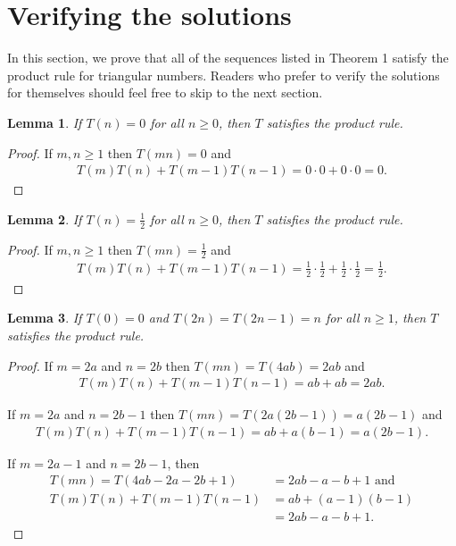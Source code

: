 \documentclass[11pt,fleqn]{amsart}
\newtheorem{lemma}{Lemma}
\begin{document}
\section{Verifying the solutions}
In this section, we prove that all of the sequences listed in Theorem 1 
satisfy the product rule for triangular numbers. Readers who prefer to
verify the solutions for themselves should feel free to skip to the next
section.

\begin{lemma}
If $T(n) = 0$ for all $n \ge 0$, then $T$ satisfies the product rule.
\end{lemma}

\begin{proof}
If $m, n \ge 1$ then $T(mn) = 0$ and
\begin{align*}
T(m) T(n) + T(m-1) T(n-1) =  0\cdot 0 + 0\cdot 0 = 0.
\end{align*}
\end{proof}

\begin{lemma}
If $T(n) = \frac12$ for all $n\ge0$, then $T$ satisfies the product rule.
\end{lemma}
\begin{proof}
If $m, n \ge 1$ then $T(mn) = \frac12$ and
\begin{align*}
T(m) T(n) + T(m-1) T(n-1) = \tfrac12 \cdot \tfrac12 + \tfrac12 \cdot \tfrac12 = \tfrac12.
\end{align*}
\end{proof}

\begin{lemma}
If $T(0) = 0$ and $T(2n) = T(2n-1) = n$ for all $n \ge 1$, then $T$ satisfies the product rule.
\end{lemma}

\begin{proof}
If $m=2a$ and $n=2b$ then $T(mn) = T(4ab) = 2ab$ and
\begin{align*}
T(m) T(n) + T(m-1) T(n-1) = ab + ab = 2ab.
\end{align*}

If $m=2a$ and $n=2b-1$ then $T(mn) = T(2a(2b-1)) = a(2b-1)$ and
\begin{align*}
T(m) T(n) + T(m-1) T(n-1) = ab + a(b-1) = a(2b-1).
\end{align*}

If $m=2a-1$ and $n=2b-1$, then 
\begin{align*}
 T(mn)  = T(4ab-2a-2b+1) & = 2ab - a - b + 1 \text{ and} \\
 T(m) T(n) + T(m-1) T(n-1) & = ab + (a-1)(b-1) \\
                                           & = 2ab - a - b + 1.
\end{align*}
\end{proof}
\end{document}
